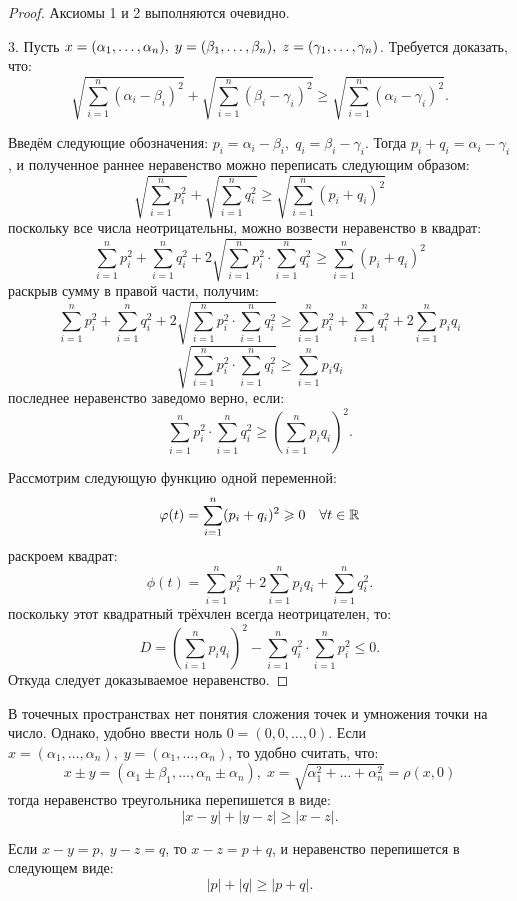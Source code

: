 \begin{proof}
Аксиомы 1 и 2 выполняются очевидно.

3. Пусть \(x = (\alpha_1, \dots, \alpha_n), \; y = (\beta_1, \dots, \beta_n), \; z \hm = (\gamma_1,
\dots, \gamma_n)\). Требуется доказать, что:
\[
    \sqrt{\sum_{i=1}^n (\alpha_i - \beta_i)^2} + \sqrt{\sum_{i=1}^n (\beta_i - \gamma_i)^2} \geq
        \sqrt{\sum_{i=1}^n (\alpha_i - \gamma_i)^2}.
\]

Введём следующие обозначения: \(p_i = \alpha_i - \beta_i, \; q_i = \beta_i - \gamma_i\). Тогда \(p_i
+ q_i = \alpha_i - \gamma_i\), и полученное раннее неравенство можно переписать следующим образом:
\[
    \sqrt{\sum_{i=1}^n p_i^2} + \sqrt{\sum_{i=1}^n q_i^2} \geq \sqrt{\sum_{i=1}^n (p_i + q_i)^2}
\]
поскольку все числа неотрицательны, можно возвести неравенство в квадрат:
\[
    \sum_{i=1}^n p_i^2 + \sum_{i=1}^n q_i^2 + 2\sqrt{\sum_{i=1}^n p_i^2 \cdot \sum_{i=1}^n q_i^2}
        \geq \sum_{i=1}^n (p_i + q_i)^2
\]
раскрыв сумму в правой части, получим:
\[
    \sum_{i=1}^n p_i^2 + \sum_{i=1}^n q_i^2 + 2\sqrt{\sum_{i=1}^n p_i^2 \cdot \sum_{i=1}^n q_i^2}
        \geq \sum_{i=1}^n p_i^2 + \sum_{i=1}^n q_i^2 + 2\sum_{i=1}^n p_i q_i
\]
\[
    \sqrt{\sum_{i=1}^n p_i^2 \cdot \sum_{i=1}^n q_i^2} \geq \sum_{i=1}^n p_i q_i
\]
последнее неравенство заведомо верно, если:
\[
    \sum_{i=1}^n p_i^2 \cdot \sum_{i=1}^n q_i^2 \geq \left(\sum_{i=1}^n p_i q_i\right)^2.
\]

Рассмотрим следующую функцию одной переменной:
\[
    \varphi(t) = \sum_{i=1}^n (p_i + q_i)^2 \geqslant 0 \quad \forall t \in \mathbb{R}
\]
раскроем квадрат:
\[
    \phi(t) = \sum_{i=1}^n p_i^2 + 2\sum_{i=1}^n p_i q_i + \sum_{i=1}^n q_i^2.
\]
поскольку этот квадратный трёхчлен всегда неотрицателен, то:
\[
    D = \left(\sum_{i = 1}^n p_i q_i\right)^2 - \sum_{i=1}^n q_i^2 \cdot \sum_{i=1}^n p_i^2 \leq 0.
\]
Откуда следует доказываемое неравенство.
\end{proof}

\begin{note}
В точечных пространствах нет понятия сложения точек и умножения точки на число. Однако, удобно
ввести ноль \(0 = (0, 0, \dots, 0)\). Если \(x = (\alpha_1, \dots, \alpha_n), \; y = (\alpha_1,
\dots, \alpha_n)\), то удобно считать, что:
\[
    x \pm y = (\alpha_1 \pm \beta_1, \dots, \alpha_n \pm \alpha_n), \; x = \sqrt{\alpha_1^2 + \dots
        + \alpha_n^2} = \rho(x, 0)
\]
тогда неравенство треугольника перепишется в виде:
\[
    |x - y| + |y - z| \geq |x - z|.
\]

Если \(x - y = p, \; y - z = q\), то \(x - z = p + q\), и неравенство перепишется в следующем виде:
\[
    |p| + |q| \geq |p + q|.
\]
\end{note}

